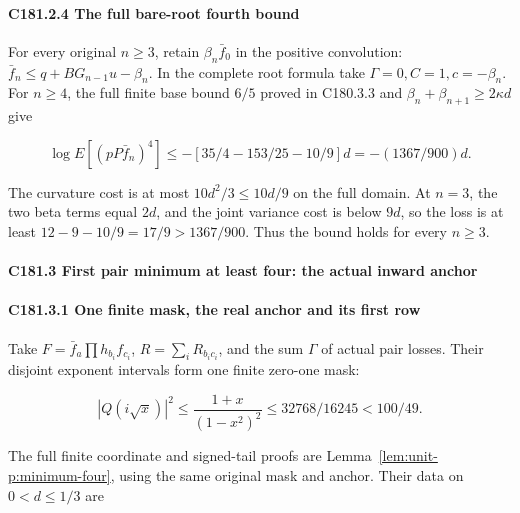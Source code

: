 \paragraph{C181.2.4 The full bare-root fourth bound}

For every original \(n\ge3\), retain \(\beta_n\bar f_0\) in the positive convolution: \(\bar f_n\le q+BG_{n-1}u-\beta_n\). In the complete root formula take \(\Gamma=0,\allowbreak \allowbreak  C=1,\allowbreak \allowbreak  c=-\beta_n\). For \(n\ge4\), the full finite base bound \(6/5\) proved in C180.3.3 and \(\beta_n+\beta_{n+1}\ge2\kappa d\) give

\[
\log E[(pP \bar f_n)^4]\le-[35/4-153/25-10/9]d
=-(1367/900)d.
\tag{C181.T190.14}
\]

The curvature cost is at most \(10d^2/3\le10d/9\) on the full domain. At \(n=3\), the two beta terms equal \(2d\), and the joint variance cost is below \(9d\), so the loss is at least \(12-9-10/9=17/9>1367/900\). Thus the bound holds for every \(n\ge3\).

\paragraph{C181.3 First pair minimum at least four: the actual inward anchor}

\paragraph{C181.3.1 One finite mask, the real anchor and its first row}

Take \(F=\bar f_a\prod h_{b_i}f_{c_i}\), \(R=\sum_iR_{b_ic_i}\), and the sum \(\Gamma\) of actual pair losses. Their disjoint exponent intervals form one finite zero-one mask:

\[
|Q(i\sqrt x)|^2\le\frac{1+x}{(1-x^2)^2}
\le32768/16245<100/49.
\tag{C181.T190.15}
\]

The full finite coordinate and signed-tail proofs are Lemma~\ref{lem:unit-p:minimum-four}, using the same original mask and anchor. Their data on \(0<d\le1/3\) are


